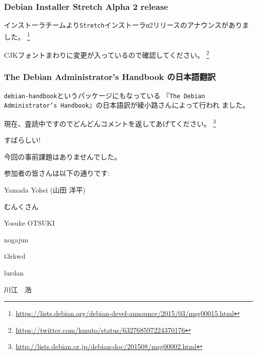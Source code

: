 \documentclass[mingoth,a4paper]{jsarticle}
\begin{document}
\subsubsection{Debian Installer Stretch Alpha 2 release}

インストーラチームより{\tt Stretch}インストーラα2リリースのアナウンスがありました。
\footnote{\url{https://lists.debian.org/debian-devel-announce/2015/03/msg00015.html}}

CJKフォントまわりに変更が入っているので確認してください。
\footnote{\url{https://twitter.com/kmuto/status/632768597224370176}}

\subsubsection{The Debian Administrator's Handbook の日本語翻訳}

{\tt debian-handbook}というパッケージにもなっている
『{\tt The Debian Administrator's Handbook}』の日本語訳が綾小路さんによって行われ
ました。

現在、査読中ですのでどんどんコメントを返してあげてください。
\footnote{\url{http://lists.debian.or.jp/debian-doc/201508/msg00002.html}}

すばらしい!



今回の事前課題はありませんでした。

参加者の皆さんは以下の通りです:

\begin{prework}{ Yamada Yohei (山田 洋平) }
\end{prework}

\begin{prework}{ むんくさん }
\end{prework}

\begin{prework}{ Yosuke OTSUKI }
\end{prework}

\begin{prework}{ nogajun }
\end{prework}

\begin{prework}{ t3rkwd }
\end{prework}

\begin{prework}{ lurdan }
\end{prework}

\begin{prework}{ 川江　浩 }
\end{prework}
\end{document}

